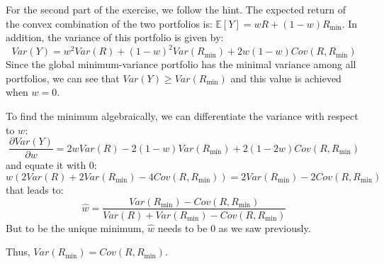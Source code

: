 \documentclass[10pt]{article}
\newcommand{\Ebb}{\mathbb{E}}
\newenvironment{exercise}[2][Exercise]{\begin{trivlist}
  \item[\hskip \labelsep {\bfseries #1}\hskip \labelsep {\bfseries #2.}]}{\end{trivlist}}
\begin{document}
\begin{exercise}{2}
  For the second part of the exercise, we follow the hint. The expected return of the convex combination of the two portfolios is: $ \Ebb[Y] = wR + (1-w)R_{\text{min}}$. In addition, the variance of this portfolio is given by:
  $$ Var(Y) = w^2Var(R) + (1-w)^2Var(R_{\text{min}}) + 2w(1-w)Cov(R,R_{\text{min}})$$
  Since the global minimum-variance portfolio has the minimal variance among all portfolios, we can see that $Var(Y) \geq Var(R_{\text{min}})$ and this value is achieved when $w = 0$. 

  To find the minimum algebraically, we can differentiate the variance with respect to $w$: $$ \frac{\partial Var(Y)}{\partial w } = 2wVar(R) - 2(1-w)Var(R_{\text{min}})+2(1-2w)Cov(R,R_{\text{min}})$$ and equate it with $0$:
  $$ w(2Var(R) + 2Var(R_{\text{min}})-4Cov(R,R_{\text{min}})) = 2Var(R_{\text{min}})-2Cov(R,R_{\text{min}})$$ that leads to: 
  $$ \hat{w} = \frac{Var(R_{\text{min}})-Cov(R,R_{\text{min}})}{Var(R)+Var(R_{\text{min}})-Cov(R,R_{\text{min}})}$$
  But to be the unique minimum, $\hat{w}$ needs to be $0$ as we saw previously. 

  Thus, $ Var(R_{\text{min}}) = Cov(R,R_{\text{min}})$.

\end{exercise}

\newpage
\end{document}
